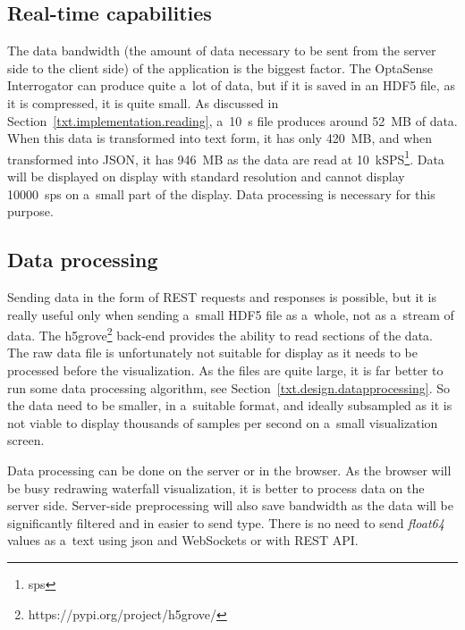 \subsection{Real-time capabilities}\label{txt.design.frontend.realtime}

The data bandwidth (the amount of data necessary to be sent from the server side to the client side) of the application is the biggest factor. The OptaSense Interrogator can produce quite a~lot of data, but if it is saved in an HDF5 file, as it is compressed, it is quite small. As discussed in Section~\ref{txt.implementation.reading}, a~\qty{10}{\second} file produces around \qty{52}{MB} of data. When this data is transformed into text form, it has only \qty{420}{MB}, and when transformed into JSON, it has \qty{946}{MB} as the data are read at  \qty{10}{kSPS}\footnote{\ac{sps}}. Data will be displayed on display with standard resolution and cannot display \qty{10000}{\ac{sps}} on a~small part of the display. Data processing is necessary for this purpose.

\subsection{Data processing}\label{txt.design.frontend.dataproc}

Sending data in the form of REST requests and responses is possible, but it is really useful only when sending a~small HDF5 file as a~whole, not as a~stream of data. The h5grove\footnote{https://pypi.org/project/h5grove/} back-end provides the ability to read sections of the data. The raw data file is unfortunately not suitable for display as it needs to be processed before the visualization. As the files are quite large, it is far better to run some data processing algorithm, see Section~\ref{txt.design.datapprocessing}. So the data need to be smaller, in a~suitable format, and ideally subsampled as it is not viable to display thousands of samples per second on a~small visualization screen.

Data processing can be done on the server or in the browser. As the browser will be busy redrawing waterfall visualization, it is better to process data on the server side. Server-side preprocessing will also save bandwidth as the data will be significantly filtered and in easier to send type. There is no need to send \textit{float64} values as a~text using \ac{json} and WebSockets or with REST API. 




